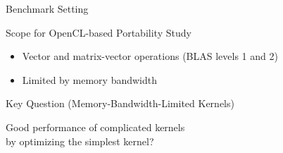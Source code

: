 

\begin{frame}{Benchmark Setting}

  \begin{block}{Scope for OpenCL-based Portability Study}
    \begin{itemize}
     \item Vector and matrix-vector operations (BLAS levels 1 and 2)
     \item Limited by memory bandwidth
    \end{itemize}
  \end{block}

  \pause
  \begin{block}{Key Question (Memory-Bandwidth-Limited Kernels)}
    \begin{center} \color{red} \LARGE
     Good performance of complicated kernels \\
     by optimizing the simplest kernel?
    \end{center}
  \end{block}

\end{frame}


